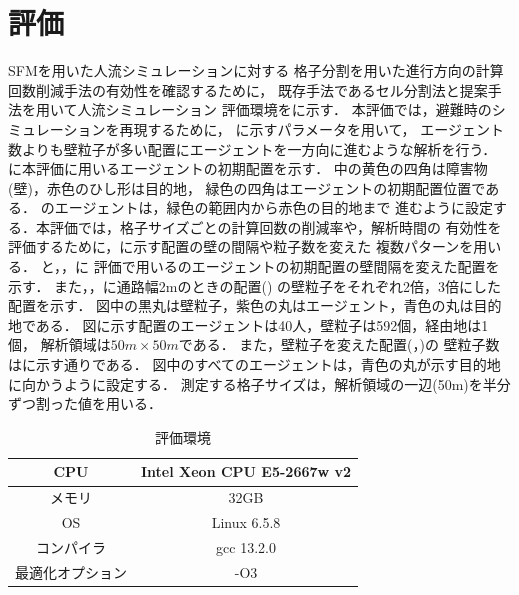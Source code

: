 \section{評価}
SFMを用いた人流シミュレーションに対する
格子分割を用いた進行方向の計算回数削減手法の有効性を確認するために，
既存手法であるセル分割法と提案手法を用いて人流シミュレーション
評価環境をに示す．
本評価では，避難時のシミュレーションを再現するために，
に示すパラメータを用いて，
エージェント数よりも壁粒子が多い配置にエージェントを一方向に進むような解析を行う．
に本評価に用いるエージェントの初期配置を示す．
中の黄色の四角は障害物(壁)，赤色のひし形は目的地，
緑色の四角はエージェントの初期配置位置である．
のエージェントは，緑色の範囲内から赤色の目的地まで
進むように設定する．本評価では，格子サイズごとの計算回数の削減率や，解析時間の
有効性を評価するために，に示す配置の壁の間隔や粒子数を変えた
複数パターンを用いる．
と，，に
評価で用いるのエージェントの初期配置の壁間隔を変えた配置を示す．
また，，に通路幅2mのときの配置()
の壁粒子をそれぞれ2倍，3倍にした配置を示す．
図中の黒丸は壁粒子，紫色の丸はエージェント，青色の丸は目的地である．
図に示す配置のエージェントは40人，壁粒子は592個，経由地は1個，
解析領域は$50m \times 50m$である．
また，壁粒子を変えた配置(，)の
壁粒子数はに示す通りである．
図中のすべてのエージェントは，青色の丸が示す目的地に向かうように設定する．
測定する格子サイズは，解析領域の一辺(50m)を半分ずつ割った値を用いる．

\begin{table}[t]
  \begin{center}
    \caption{評価環境}
      \label{tb:result_env}
      \begin{tabular}{c|c}
      \hline \hline
      CPU              & Intel Xeon CPU E5-2667w v2 \\ \hline
      メモリ           & 32GB                       \\ \hline
      OS               & Linux 6.5.8               \\ \hline
      コンパイラ       & gcc 13.2.0                  \\ \hline
      最適化オプション & -O3                        \\ \hline
    \end{tabular}
  \end{center}
\end{table}

